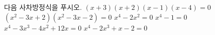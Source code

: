 다음 사차방정식을 푸시오.
 $(x+3)(x+2)(x-1)(x-4)=0$
 $(x^2-3x+2)(x^2-3x-2)=0$
 $x^4-2x^2=0$
 $x^4-1=0$
 $x^4-3x^3-4x^2+12x=0$
 $x^4-2x^3+x-2=0$
